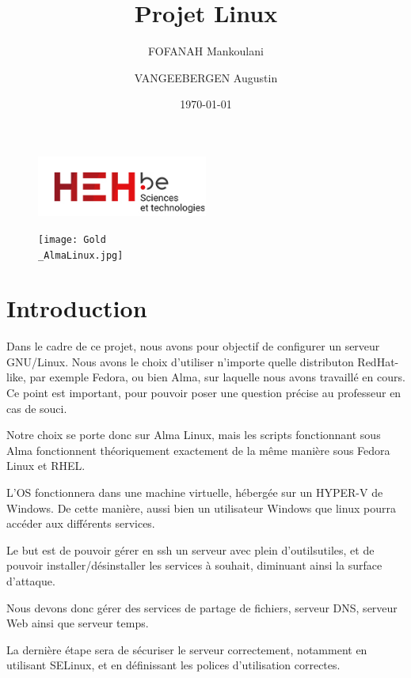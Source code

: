 \documentclass{article}
\title{Projet Linux}
\author{FOFANAH Mankoulani \and VANGEEBERGEN Augustin}
\date{\today}
\begin{document}
	
	\maketitle
	
	\begin{figure}[h]
		\centering
		\includegraphics[width=0.5\textwidth]{logo.png}
		\label{fig:logoheh}
	\end{figure}
	
	\begin{figure}[h]
		\centering
		\texttt{[image: Gold\\\_AlmaLinux.jpg]}	
		\label{fig:logoheh}
	\end{figure}
	
	\newpage


	\tableofcontents
	\newpage
	
	
	
	
	
	\section{Introduction}
	Dans le cadre de ce projet, nous avons pour objectif de configurer un serveur GNU/Linux. Nous avons le choix d'utiliser n'importe quelle distributon RedHat-like, par exemple Fedora, ou bien Alma, sur laquelle nous avons travaillé en cours. Ce point est important, pour pouvoir poser une question précise au professeur en cas de souci.
	
	Notre choix se porte donc sur Alma Linux, mais les scripts fonctionnant sous Alma fonctionnent théoriquement exactement de la même manière sous Fedora Linux et RHEL.
	
	L'OS fonctionnera dans une machine virtuelle, hébergée sur un HYPER-V de Windows. De cette manière, aussi bien un utilisateur Windows que linux pourra accéder aux différents services.
	
	Le but est de pouvoir gérer en ssh un serveur avec plein d'outilsutiles, et de pouvoir installer/désinstaller les services à souhait, diminuant ainsi la surface d'attaque.
	
	Nous devons donc gérer des services de partage de fichiers, serveur DNS, serveur Web ainsi que serveur temps.
	
	La dernière étape sera de sécuriser le serveur correctement, notamment en utilisant SELinux, et en définissant les polices d'utilisation correctes.
	
\end{document}
